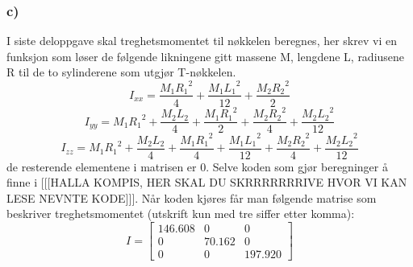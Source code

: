 \subsubsection{c)}
I siste deloppgave skal treghetsmomentet til nøkkelen beregnes, her skrev vi en funksjon som løser de følgende likningene gitt massene M, lengdene L, radiusene R til de to sylinderene som utgjør T-nøkkelen. \begin{equation}
    I_{xx}= \frac{M_1{R_1}^2}{4} + \frac{M_1{L_1}^2}{12} + \frac{M_2{R_2}^2}{2}
\end{equation}
\begin{equation}
    I_{yy}= M_1{R_1}^2 + \frac{M_2{L_2}}{4} + \frac{M_1{R_1}^2}{2} + \frac{M_2{R_2}^2}{4} + \frac{M_2{L_2}^2}{12}
\end{equation}
\begin{equation}
    I_{zz}= M_1{R_1}^2 + \frac{M_2{L_2}}{4} + \frac{M_1{R_1}^2}{4} + \frac{M_1{L_1}^2}{12} + \frac{M_2{R_2}^2}{4} + \frac{M_2{L_2}^2}{12}
\end{equation} 
\newline
de resterende elementene i matrisen er 0. Selve koden som gjør beregninger å finne i [[[HALLA KOMPIS, HER SKAL DU SKRRRRRRRIVE HVOR VI KAN LESE NEVNTE KODE]]]. Når koden kjøres får man følgende matrise som beskriver treghetsmomentet (utskrift kun med tre siffer etter komma): \newline
\begin{equation}
I = 
\begin{bmatrix}
146.608 & 0 & 0 \\
0 & 70.162 & 0 \\
0 & 0 & 197.920
\end{bmatrix}
\end{equation}